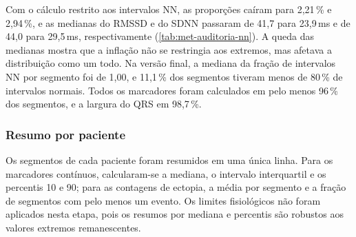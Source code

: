 Com o cálculo restrito aos intervalos NN, as proporções caíram para
2,21\,\% e 2,94\,\%, e as medianas do RMSSD e do SDNN passaram de 41,7 para
23,9\,ms e de 44,0 para 29,5\,ms, respectivamente
(\autoref{tab:met-auditoria-nn}). A queda das medianas mostra que a
inflação não se restringia aos extremos, mas afetava a distribuição como um
todo. Na versão final, a mediana da fração de intervalos NN por segmento foi
de 1,00, e 11,1\,\% dos segmentos tiveram menos de 80\,\% de intervalos
normais. Todos os marcadores foram calculados em pelo menos 96\,\% dos
segmentos, e a largura do QRS em 98,7\,\%.

\begin{table}[h!]
	\captionsetup{width=13cm}
\end{table}

\subsubsection{Resumo por paciente}

Os segmentos de cada paciente foram resumidos em uma única linha. Para os
marcadores contínuos, calcularam-se a mediana, o intervalo interquartil e os
percentis 10 e 90; para as contagens de ectopia, a média por segmento e a
fração de segmentos com pelo menos um evento. Os limites fisiológicos não
foram aplicados nesta etapa, pois os resumos por mediana e percentis são
robustos aos valores extremos remanescentes.

